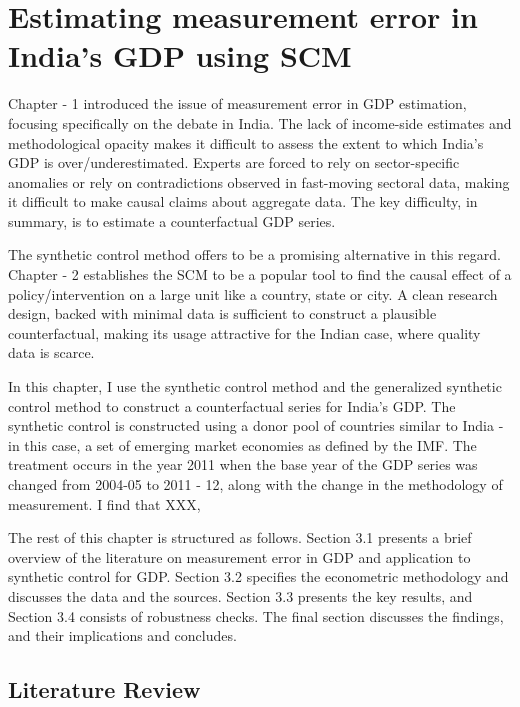 \documentclass[12pt,nobind, a4paper]{reedthesis}
\begin{document}
 \hypertarget{estimating-measurement-error-in-indias-gdp-using-scm}{%
 \chapter{Estimating measurement error in India's GDP using SCM}\label{estimating-measurement-error-in-indias-gdp-using-scm}}

 Chapter - 1 introduced the issue of measurement error in GDP estimation, focusing specifically on the debate in India. The lack of income-side estimates and methodological opacity makes it difficult to assess the extent to which India's GDP is over/underestimated. Experts are forced to rely on sector-specific anomalies or rely on contradictions observed in fast-moving sectoral data, making it difficult to make causal claims about aggregate data. The key difficulty, in summary, is to estimate a counterfactual GDP series.
 \linebreak

 The synthetic control method offers to be a promising alternative in this regard. Chapter - 2 establishes the SCM to be a popular tool to find the causal effect of a policy/intervention on a large unit like a country, state or city. A clean research design, backed with minimal data is sufficient to construct a plausible counterfactual, making its usage attractive for the Indian case, where quality data is scarce.
 \linebreak

 In this chapter, I use the synthetic control method and the generalized synthetic control method to construct a counterfactual series for India's GDP. The synthetic control is constructed using a donor pool of countries similar to India - in this case, a set of emerging market economies as defined by the IMF. The treatment occurs in the year 2011 when the base year of the GDP series was changed from 2004-05 to 2011 - 12, along with the change in the methodology of measurement. I find that XXX,
 \linebreak

 The rest of this chapter is structured as follows. Section 3.1 presents a brief overview of the literature on measurement error in GDP and application to synthetic control for GDP. Section 3.2 specifies the econometric methodology and discusses the data and the sources. Section 3.3 presents the key results, and Section 3.4 consists of robustness checks. The final section discusses the findings, and their implications and concludes.

 \hypertarget{literature-review}{%
 \section{Literature Review}\label{literature-review}}
\end{document}
